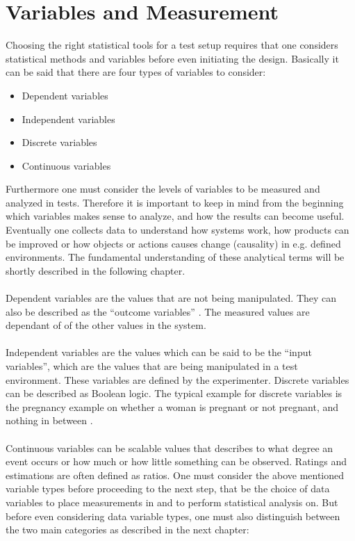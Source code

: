  \section{Variables and Measurement}
 Choosing the right statistical tools for a test setup requires that one considers statistical methods and variables before even initiating the design. Basically it can be said that there are four types of variables to consider: 
\begin{itemize}
  \item Dependent variables
  \item Independent variables
  \item Discrete variables
  \item Continuous variables
\end{itemize}
Furthermore one must consider the levels of variables to be measured and analyzed in tests. Therefore it is important to keep in mind from the beginning which variables makes sense to analyze, and how the results can become useful. Eventually one collects data to understand how systems work, how products can be improved or how objects or actions causes change (causality) in e.g. defined environments. The fundamental understanding of these analytical terms will be shortly described in the following chapter.\\\\
Dependent variables are the values that are not being manipulated. They can also be described as the “outcome variables” \citep[page 21]{Design}. The measured values are dependant of of the other values in the system.\\\\
Independent variables are the values which can be said to be the “input variables”, which are the values that are being manipulated in a test environment. These variables are defined by the experimenter.
Discrete variables can be described as Boolean logic. The typical example for discrete variables is the pregnancy example on whether a woman is pregnant or not pregnant, and nothing in between \citep[page 9]{Design}.\\\\
Continuous variables can be scalable values that describes to what degree an event occurs or how much or how little something can be observed. Ratings and estimations are often defined as ratios. 
One must consider the above mentioned variable types before proceeding to the next step, that be the choice of data variables to place measurements in and to perform statistical analysis on. But before even considering data variable types, one must also distinguish between the two main categories as described in the next chapter: 
